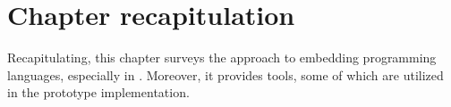 \documentclass[thesis-solanki.tex]{subfiles}
\begin{document}


\section{Chapter recapitulation}
Recapitulating, this chapter surveys the approach to embedding programming languages, especially  in .
Moreover, it provides tools, some of which are utilized in the prototype implementation.   

\ifMain
\begin{scope}
  \nolinenumbers
  \enotesize
  \par
  \begin{singlespace}
  \setlength{\parskip}{12pt plus 2pt minus 1pt}
  \theendnotes
  \par
  \end{singlespace}
\end{scope}
\fi
\end{document}
